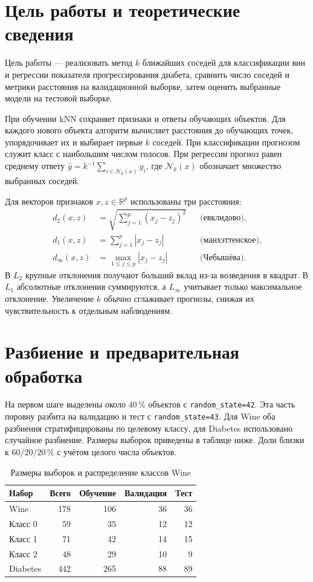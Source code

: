\section{Цель работы и теоретические сведения}

Цель работы --- реализовать метод \(k\) ближайших соседей для классификации
вин и регрессии показателя прогрессирования диабета, сравнить число соседей
и метрики расстояния на валидационной выборке, затем оценить выбранные модели
на тестовой выборке.

При обучении kNN сохраняет признаки и ответы обучающих объектов. Для каждого
нового объекта алгоритм вычисляет расстояния до обучающих точек, упорядочивает
их и выбирает первые \(k\) соседей. При классификации прогнозом служит класс
с наибольшим числом голосов. При регрессии прогноз равен среднему ответу
\(\hat y=k^{-1}\sum_{i\in\mathcal N_k(x)}y_i\), где \(\mathcal N_k(x)\)
обозначает множество выбранных соседей.

Для векторов признаков \(x,z\in\mathbb R^p\) использованы три расстояния:
\[
\begin{aligned}
 d_2(x,z) &= \sqrt{\sum_{j=1}^{p}(x_j-z_j)^2}
 &&\text{(евклидово)},\\
 d_1(x,z) &= \sum_{j=1}^{p}|x_j-z_j|
 &&\text{(манхэттенское)},\\
 d_\infty(x,z) &= \max_{1\le j\le p}|x_j-z_j|
 &&\text{(Чебышёва)}.
\end{aligned}
\]
В \(L_2\) крупные отклонения получают больший вклад из-за возведения в квадрат.
В \(L_1\) абсолютные отклонения суммируются, а \(L_\infty\) учитывает только
максимальное отклонение. Увеличение \(k\) обычно сглаживает прогнозы, снижая
их чувствительность к отдельным наблюдениям.

\section{Разбиение и предварительная обработка}

На первом шаге выделены около \(40\,\%\) объектов с \texttt{random\_state=42}.
Эта часть поровну разбита на валидацию и тест с \texttt{random\_state=43}.
Для Wine оба разбиения стратифицированы по целевому классу, для Diabetes
использовано случайное разбиение. Размеры выборок приведены в таблице ниже.
Доли близки к \(60/20/20\,\%\) с учётом целого числа объектов.

\begin{table}[!ht]
\centering\small
\caption{Размеры выборок и распределение классов Wine}
\begin{tabular}{lrrrr}
\toprule
Набор & Всего & Обучение & Валидация & Тест \\
\midrule
Wine & 178 & 106 & 36 & 36 \\
\quad Класс 0 & 59 & 35 & 12 & 12 \\
\quad Класс 1 & 71 & 42 & 14 & 15 \\
\quad Класс 2 & 48 & 29 & 10 & 9 \\
Diabetes & 442 & 265 & 88 & 89 \\
\bottomrule
\end{tabular}
\end{table}

